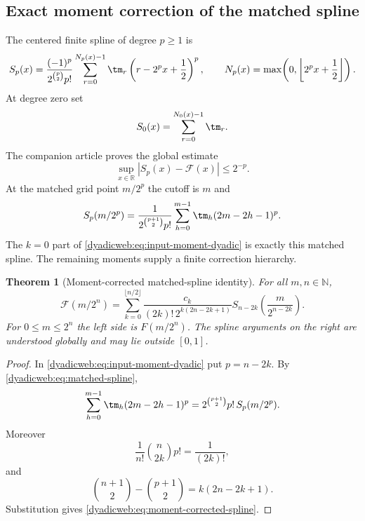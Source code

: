 \documentclass[11pt,oneside]{article}
\newtheorem{theorem}{Theorem}[section]
\theoremstyle{definition}
\theoremstyle{remark}
\newcommand{\R}{\mathbb R}
\newcommand{\N}{\mathbb N}
\begin{document}
\subsection{Exact moment correction of the matched spline}
\label{dyadicweb:subsec:moment-corrected-spline}

The centered finite spline of degree $p\ge1$ is
\begin{equation}
 S_p(x)=\frac{(-1)^p}{2^{\binom p2}p!}
 \sum_{r=0}^{N_p(x)-1}\tm_r\left(r-2^px+\frac12\right)^p,
 \qquad
 N_p(x)=\max\!\left(0,\left\lfloor2^px+\frac12\right\rfloor\right). \label{dyadicweb:eq:centered-spline-local}
\end{equation}
At degree zero set
\begin{equation}
 S_0(x)=\sum_{r=0}^{N_0(x)-1}\tm_r.                        \label{dyadicweb:eq:S0-local}
\end{equation}
The companion article proves the global estimate
\begin{equation}
 \sup_{x\in\R}|S_p(x)-\mathcal F(x)|\le2^{-p}.             \label{dyadicweb:eq:centered-global-error-input}
\end{equation}
At the matched grid point $m/2^p$ the cutoff is $m$ and
\begin{equation}
 S_p(m/2^p)=\frac{1}{2^{\binom{p+1}{2}}p!}
 \sum_{h=0}^{m-1}\tm_h(2m-2h-1)^p.                       \label{dyadicweb:eq:matched-spline}
\end{equation}
The $k=0$ part of \eqref{dyadicweb:eq:input-moment-dyadic} is exactly this matched spline.  The remaining
moments supply a finite correction hierarchy.

\begin{theorem}[Moment-corrected matched-spline identity]
\label{dyadicweb:thm:moment-corrected-spline}
For all $m,n\in\N$,
\begin{equation}
 \boxed{
 \mathcal F(m/2^n)=
 \sum_{k=0}^{\lfloor n/2\rfloor}
 \frac{c_k}{(2k)!\,2^{k(2n-2k+1)}}
 S_{n-2k}\!\left(\frac{m}{2^{n-2k}}\right).}              \label{dyadicweb:eq:moment-corrected-spline}
\end{equation}
For $0\le m\le2^n$ the left side is $F(m/2^n)$.  The spline arguments on the right are
understood globally and may lie outside $[0,1]$.
\end{theorem}

\begin{proof}
In \eqref{dyadicweb:eq:input-moment-dyadic} put $p=n-2k$.  By
\eqref{dyadicweb:eq:matched-spline},
\[
 \sum_{h=0}^{m-1}\tm_h(2m-2h-1)^p
 =2^{\binom{p+1}{2}}p!\,S_p(m/2^p).
\]
Moreover
\[
 \frac1{n!}\binom n{2k}p!=\frac1{(2k)!},
\]
and
\[
 \binom{n+1}{2}-\binom{p+1}{2}=k(2n-2k+1).
\]
Substitution gives \eqref{dyadicweb:eq:moment-corrected-spline}.
\end{proof}
\end{document}
